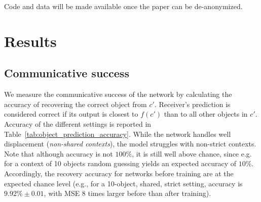 \documentclass[11pt,a4paper]{article}
\newcommand{\nbEC}[1]{{\leavevmode\color{blue}{\scriptsize#1}}}
\begin{document}
Code and data will be made available once the paper can be de-anonymized. \nbEC{Save space by shortening this remark or integrating it better to a paragraph}

\section{Results}

\subsection{Communicative success}

We measure the communicative success of the network by calculating the accuracy of recovering the correct object from $c'$. Receiver's prediction is considered correct if its output is closest to $f(c')$ than to all other objects in $c'$. Accuracy of the different settings is reported in Table~\ref{tab:object_prediction_accuracy}. While the network handles well displacement (\textit{non-shared contexts}), the model struggles with non-strict contexts. Note that although accuracy is not $100\%$, it is still well above chance, since e.g. for a context of 10 objects random guessing yields an expected accuracy of $10\%$. 
Accordingly, the recovery accuracy for networks before training are at the expected chance level (e.g., for a 10-object, shared, strict setting, accuracy is $9.92\%\pm 0.01$, with MSE 8 times larger before than after training).

\end{document}
